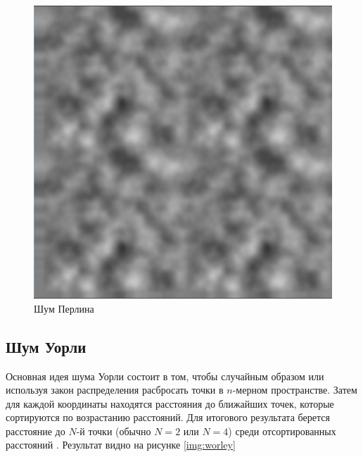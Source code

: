 \begin{figure}[H]
    \centering
    \includegraphics[scale=0.4]{img/perlin.png}
    \caption{Шум Перлина}
    \label{img:perlin}
\end{figure}

\subsection{Шум Уорли}

Основная идея шума Уорли состоит в том, чтобы случайным образом или используя закон распределения
расбросать точки в $n$-мерном пространстве. Затем для каждой координаты находятся расстояния до
ближайших точек, которые сортируются по возрастанию расстояний. Для итогового результата берется расстояние
до $N$-й точки (обычно $N=2$ или $N=4$) среди отсортированных расстояний \cite{Worley}.
Результат видно на рисунке \ref{img:worley}

